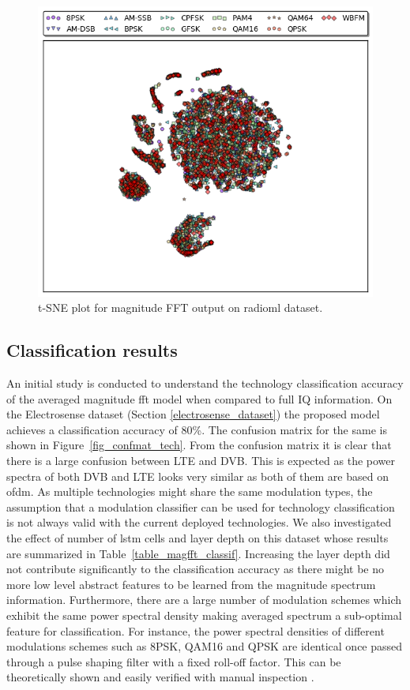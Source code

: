 \begin{figure}[!t]
\centering
\includegraphics[width=1\columnwidth]{figures/tsne_rml_dataset.png}
\caption{t-SNE plot for magnitude FFT output on radioml dataset.} 
\label{fig_tsne}
\end{figure}

\subsection{Classification results}
An initial study is conducted to understand the technology classification accuracy of the averaged magnitude \ac{fft} model when compared to full IQ information. On the Electrosense dataset (Section \ref{electrosense_dataset}) the proposed model achieves a classification accuracy of 80\%. The confusion matrix for the same is shown in Figure~\ref{fig_confmat_tech}.  From the confusion matrix it is clear that there is a large confusion between LTE and DVB. This is expected as the power spectra of both DVB and LTE looks very similar as both of them are based on \ac{ofdm}. As multiple technologies might share the same modulation types, the assumption that a modulation classifier can be used for technology classification is not always valid with the current deployed technologies. We also investigated the effect of number of \ac{lstm} cells and layer depth on this dataset whose results are summarized in Table~\ref{table_magfft_classif}. Increasing the layer depth did not contribute significantly to the classification accuracy as there might be no more low level abstract features to be learned from the magnitude spectrum information. Furthermore, there are a large number of modulation schemes which exhibit the same power spectral density making averaged spectrum a sub-optimal feature for classification. For instance, the power spectral densities of different modulations schemes such as 8PSK, QAM16 and QPSK are identical once passed through a pulse shaping filter with a fixed roll-off factor. This can be theoretically shown and easily verified with manual inspection \cite{digital_psd}. 

